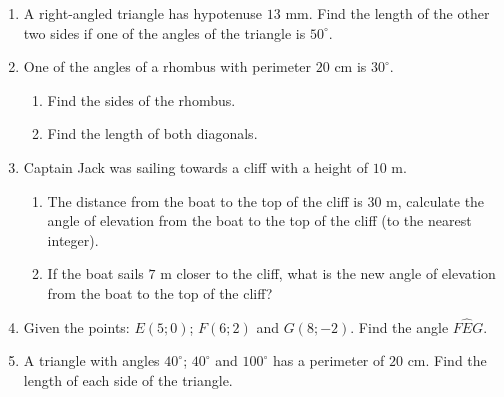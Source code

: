 \begin{eocexercises}{}
\begin{enumerate}[noitemsep, label=\textbf{\arabic*}. ]
\item A right-angled triangle has hypotenuse $13$ mm. Find the length of the other two sides if one of the angles of the triangle is $50^{\circ}$.
\item One of the angles of a rhombus with perimeter $20$ cm is $30^{\circ}$. 
\begin{enumerate} 
\item Find the sides of the rhombus. 
\item Find the length of both diagonals. 
\end{enumerate} 
\item Captain Jack was sailing towards a cliff with a height of $10$ m. 
\begin{enumerate} 
\item The distance from the boat to the top of the cliff is $30$ m, calculate the angle of elevation from the boat to the top of the cliff (to the nearest integer).
\item If the boat sails $7$ m closer to the cliff, what is the new angle of elevation from the boat to the top of the cliff? 
\end{enumerate} 
\item Given the points: $E(5;0)$; $F(6;2)$ and $G(8;-2)$. Find the angle $F\hat{E}G$. 
\item  A triangle with angles $40^{\circ}$; $40^{\circ}$ and $100^{\circ}$ has a perimeter of $20$ cm. Find the length of each side of the triangle. 

\end{enumerate}
\end{eocexercises}




















